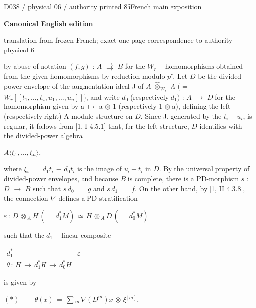 \documentclass[9pt]{article}
\newcommand{\CanonText}[1]{\par{\fontsize{8.0}{9.35}\selectfont\RaggedRight #1\par}\vspace{2.2pt}}
\newcommand{\CanonDisplay}[1]{\par\vspace{1.2pt}\begin{center}{\fontsize{7.2}{8.4}\selectfont\(\displaystyle #1\)}\end{center}\vspace{1.2pt}}
\newenvironment{CanonMathBlock}{\par\vspace{1.2pt}\begin{center}\fontsize{6.8}{8.0}\selectfont\(\displaystyle}{\)\end{center}\vspace{1.2pt}}
\newcommand{\LayerTitle}{Canonical English edition}
\begin{document}
\noindent\begin{minipage}[t][\dimexpr\textheight-5pt\relax][t]{\textwidth}
{\sffamily\fontsize{7.3}{8.2}\selectfont\color{Quiet} D038 / physical 06 / authority printed 85\hfill French main exposition}
\par{}\vspace{4.5pt}
{\sffamily\fontsize{10.4}{11.6}\selectfont\bfseries\color{Accent} \LayerTitle}
\par{\sffamily\fontsize{6.7}{7.7}\selectfont\color{Quiet} translation from frozen French; exact one-page correspondence to authority physical 6}
\vspace{5pt}
\CanonText{by abuse of notation \((f,g)\) : \(A\) \(\rightrightarrows{}\) \(B\) for the \(W_{r}-\text{homomorphisms}\) obtained from the given homomorphisms by reduction modulo \(p^{r}\). Let \(D\) be the divided-power envelope of the augmentation ideal J of \(A\) \(\widehat{\otimes}_{W_{r}}\) \(A\) \((=\) \(W_{r}[[t_{1},\ldots{},t_{n},u_{1},\ldots{},u_{n}]])\), and write \(d_{0}\) (respectively \(d_{1})\) : \(A\) \(\to{}\) \(D\) for the homomorphism given by a \(\mapsto{}\) a \(\otimes{}\) 1 (respectively 1 \(\otimes{}\) a), defining the left (respectively right) A-module structure on \(D\). Since J, generated by the \(t_{i}-u_{i}\), is regular, it follows from [1, I 4.5.1] that, for the left structure, \(D\) identifies with the divided-power algebra}
\CanonText{\(A\langle{}\xi{}_{1},\ldots{},\xi{}_{n}\rangle{}\),}
\CanonText{where \(\xi{}_{i}\) \(=\) \(d_{1}t_{i}\) \(-\) \(d_{0}t_{i}\) is the image of \(u_{i}-t_{i}\) in \(D\). By the universal property of divided-power envelopes, and because \(B\) is complete, there is a PD-morphism \(s\) : \(D\) \(\to{}\) \(B\) such that \(s\,d_{0}\) \(=\) \(g\) and \(s\,d_{1}\) \(=\) \(f\). On the other hand, by [1, II 4.3.8], the connection \(\nabla{}\) defines a PD-stratification}
\CanonDisplay{\varepsilon{}\,:\,D\,\otimes{}_{A}\,H\,(=\,d_{1}^{*}M)\,\simeq{}\,H\,\otimes{}_{A}\,D\,(=\,d_{0}^{*}M)}
\CanonText{such that the \(d_{1}-\text{linear}\) composite}
\begin{CanonMathBlock}
\begin{array}{cc}
d_{1}^{*} & \varepsilon{}\\
\theta{}\,:\,H\,\longrightarrow{}\,d_{1}^{*}H\,\longrightarrow{}\,d_{0}^{*}H & {}
\end{array}
\end{CanonMathBlock}
\CanonText{is given by}
\CanonDisplay{(*)\qquad\,\theta{}(x)\,=\,\sum{}_{m}\,\nabla{}(D^{m})x\,\otimes{}\,\xi{}^{[m]},}

\end{minipage}
\end{document}
